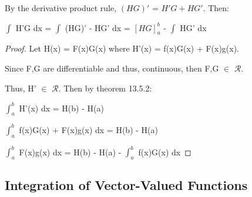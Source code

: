     \begin{intuition}
        By the derivative product rule, $(HG)'$ = $H'G + HG'$. Then:

        \hspace{0.5cm}
        $\int$ H'G dx
        = $\int$ (HG)' - HG' dx
        = $[HG]_a^b$ - $\int$ HG' dx
    \end{intuition}

    \vspace{0.1cm}

    \begin{proof}
        Let H(x) = F(x)G(x) where H'(x) = f(x)G(x) + F(x)g(x).

        Since F,G are differentiable and thus,
        continuous, then F,G $\in$ $\mathscr{R}$.

        Thus, H' $\in$ $\mathscr{R}$. Then by {\color{red} theorem 13.5.2}:

        \hspace{0.5cm}
        $\int_a^b$ H'(x) dx
        = H(b) - H(a)

        \hspace{0.5cm}
        $\int_a^b$ f(x)G(x) + F(x)g(x) dx
        = H(b) - H(a)

        \hspace{0.5cm}
        $\int_a^b$ F(x)g(x) dx
        = H(b) - H(a) - $\int_a^b$ f(x)G(x) dx
    \end{proof}

    \newpage




\subsection[ Vector-Valued Functions ]{ Integration of Vector-Valued Functions }

